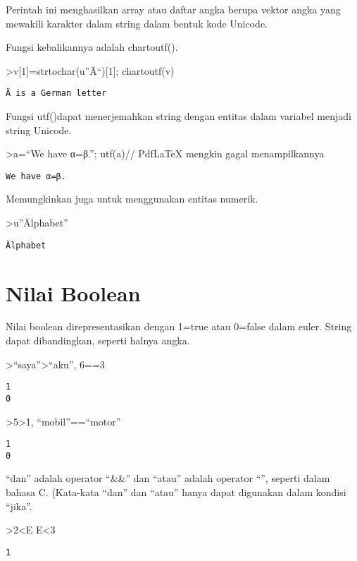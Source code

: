 \documentclass[
]{book}
\begin{document}
Perintah ini menghasilkan array atau daftar angka berupa vektor angka yang mewakili karakter dalam string dalam bentuk kode Unicode.

Fungsi kebalikannya adalah chartoutf().

\textgreater v{[}1{]}=strtochar(u''Ä``){[}1{]}; chartoutf(v)

\begin{verbatim}
Ä is a German letter
\end{verbatim}

Fungsi utf()dapat menerjemahkan string dengan entitas dalam variabel menjadi string Unicode.

\textgreater a=``We have α=β.''; utf(a)// PdfLaTeX mengkin gagal menampilkannya

\begin{verbatim}
We have α=β.
\end{verbatim}

Memungkinkan juga untuk menggunakan entitas numerik.

\textgreater u''Älphabet''

\begin{verbatim}
Älphabet
\end{verbatim}

\section{Nilai Boolean}\label{nilai-boolean}

Nilai boolean direpresentasikan dengan 1=true atau 0=false dalam euler. String dapat dibandingkan, seperti halnya angka.

\textgreater{}``saya''\textgreater{}``aku'', 6==3

\begin{verbatim}
1
0
\end{verbatim}

\textgreater5\textgreater1, ``mobil''==``motor''

\begin{verbatim}
1
0
\end{verbatim}

``dan'' adalah operator ``\&\&'' dan ``atau'' adalah operator ``\textbar\textbar{}'', seperti dalam bahasa C. (Kata-kata ``dan'' dan ``atau'' hanya dapat digunakan dalam kondisi ``jika''.

\textgreater2\textless E \textbar\textbar{} E\textless3

\begin{verbatim}
1
\end{verbatim}
\end{document}
